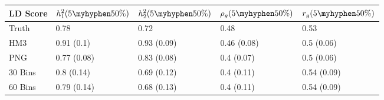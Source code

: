 \begin{table}[ht]
\centering
\begin{tabular}{lllll}
  \hline
LD Score & $h^2_1(5\myhyphen50\%)$ & $h^2_2(5\myhyphen50\%)$ & $\rho_g(5\myhyphen50\%)$ & $r_g(5\myhyphen50\%)$ \\ 
  \hline
Truth & 0.78 & 0.72 & 0.48 & 0.53 \\ 
  HM3 & 0.91 (0.1) & 0.93 (0.09) & 0.46 (0.08) & 0.5 (0.06) \\ 
  PNG & 0.77 (0.08) & 0.83 (0.08) & 0.4 (0.07) & 0.5 (0.06) \\ 
  30 Bins & 0.8 (0.14) & 0.69 (0.12) & 0.4 (0.11) & 0.54 (0.09) \\ 
  60 Bins & 0.79 (0.14) & 0.68 (0.13) & 0.4 (0.11) & 0.54 (0.09) \\ 
   \hline
\end{tabular}
\end{table}
